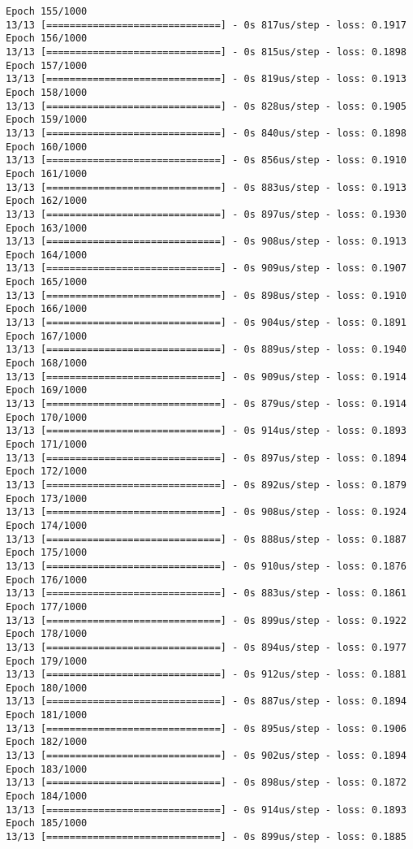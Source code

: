 \documentclass[11pt]{article}
\begin{document}
\begin{Verbatim}[commandchars=\\\{\}]
Epoch 155/1000
13/13 [==============================] - 0s 817us/step - loss: 0.1917
Epoch 156/1000
13/13 [==============================] - 0s 815us/step - loss: 0.1898
Epoch 157/1000
13/13 [==============================] - 0s 819us/step - loss: 0.1913
Epoch 158/1000
13/13 [==============================] - 0s 828us/step - loss: 0.1905
Epoch 159/1000
13/13 [==============================] - 0s 840us/step - loss: 0.1898
Epoch 160/1000
13/13 [==============================] - 0s 856us/step - loss: 0.1910
Epoch 161/1000
13/13 [==============================] - 0s 883us/step - loss: 0.1913
Epoch 162/1000
13/13 [==============================] - 0s 897us/step - loss: 0.1930
Epoch 163/1000
13/13 [==============================] - 0s 908us/step - loss: 0.1913
Epoch 164/1000
13/13 [==============================] - 0s 909us/step - loss: 0.1907
Epoch 165/1000
13/13 [==============================] - 0s 898us/step - loss: 0.1910
Epoch 166/1000
13/13 [==============================] - 0s 904us/step - loss: 0.1891
Epoch 167/1000
13/13 [==============================] - 0s 889us/step - loss: 0.1940
Epoch 168/1000
13/13 [==============================] - 0s 909us/step - loss: 0.1914
Epoch 169/1000
13/13 [==============================] - 0s 879us/step - loss: 0.1914
Epoch 170/1000
13/13 [==============================] - 0s 914us/step - loss: 0.1893
Epoch 171/1000
13/13 [==============================] - 0s 897us/step - loss: 0.1894
Epoch 172/1000
13/13 [==============================] - 0s 892us/step - loss: 0.1879
Epoch 173/1000
13/13 [==============================] - 0s 908us/step - loss: 0.1924
Epoch 174/1000
13/13 [==============================] - 0s 888us/step - loss: 0.1887
Epoch 175/1000
13/13 [==============================] - 0s 910us/step - loss: 0.1876
Epoch 176/1000
13/13 [==============================] - 0s 883us/step - loss: 0.1861
Epoch 177/1000
13/13 [==============================] - 0s 899us/step - loss: 0.1922
Epoch 178/1000
13/13 [==============================] - 0s 894us/step - loss: 0.1977
Epoch 179/1000
13/13 [==============================] - 0s 912us/step - loss: 0.1881
Epoch 180/1000
13/13 [==============================] - 0s 887us/step - loss: 0.1894
Epoch 181/1000
13/13 [==============================] - 0s 895us/step - loss: 0.1906
Epoch 182/1000
13/13 [==============================] - 0s 902us/step - loss: 0.1894
Epoch 183/1000
13/13 [==============================] - 0s 898us/step - loss: 0.1872
Epoch 184/1000
13/13 [==============================] - 0s 914us/step - loss: 0.1893
Epoch 185/1000
13/13 [==============================] - 0s 899us/step - loss: 0.1885

\end{Verbatim}
\end{document}
